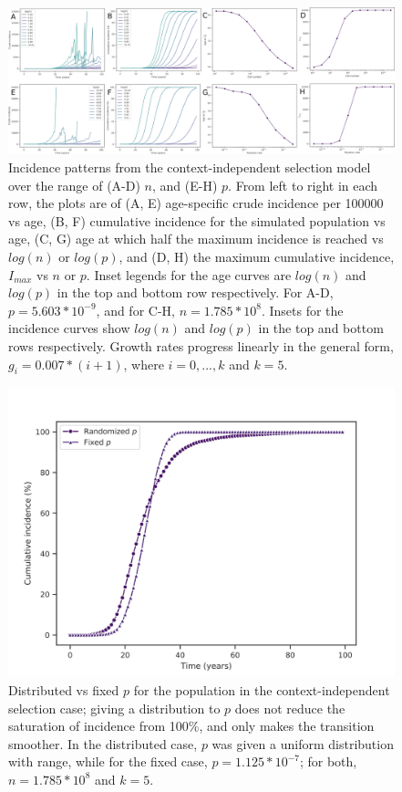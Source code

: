\documentclass[9pt,onecolumn,twoside]{pnas-new}
\begin{document}
\begin{figure}[tbhp]
	\centering
	\includegraphics[width=\linewidth]{fig3.png}
	\caption{Incidence patterns from the context-independent selection model over the range of (A-D) $n$, and (E-H) $p$. From left to right in each row, the plots are of (A, E) age-specific crude incidence per 100000 vs age, (B, F) cumulative incidence for the simulated population vs age, (C, G) age at which half the maximum incidence is reached vs $log(n)$ or $log(p)$, and (D, H) the maximum cumulative incidence, $I_{max}$ vs $n$ or $p$. Inset legends for the age curves are $log(n)$ and $log(p)$ in the top and bottom row respectively. For A-D, $p=5.603*10^{-9}$, and for C-H, $n=1.785*10^{8}$. Insets for the incidence curves show $log(n)$ and $log(p)$ in the top and bottom rows respectively. Growth rates progress linearly in the general form, $g_{i}=0.007*(i+1)$, where $i=0,...,k$ and $k=5$.}
	\label{fig3}
\end{figure}

\begin{figure}[tbhp]
	\centering
	\includegraphics[width=\linewidth]{fig4.png}
	\caption{Distributed vs fixed $p$ for the population in the context-independent selection case; giving a distribution to $p$ does not reduce the saturation of incidence from 100\%, and only makes the transition smoother. In the distributed case, $p$ was given a uniform distribution with range, while for the fixed case, $p=1.125*10^{-7}$; for both, $n=1.785*10^{8}$ and $k=5$.} 
	\label{fig4}
\end{figure}
\end{document}
